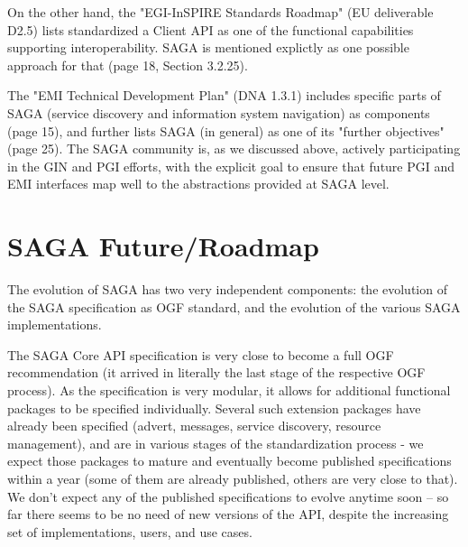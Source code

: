 \documentclass[12pt]{article}
\begin{document}
On the other hand, the "EGI-InSPIRE Standards Roadmap" (EU deliverable
D2.5) lists standardized a Client API as one of the functional
capabilities supporting interoperability.  SAGA is mentioned
explictly as one possible approach for that (page 18, Section
3.2.25).

The "EMI Technical Development Plan" (DNA 1.3.1) includes specific
parts of SAGA (service discovery and information system navigation) as
components (page 15), and further lists SAGA (in general) as one of
its "further objectives" (page 25).  The SAGA community is, as we
discussed above, actively participating in the GIN and PGI efforts,
with the explicit goal to ensure that future PGI and EMI interfaces
map well to the abstractions provided at SAGA level.



\section{SAGA Future/Roadmap}

 The evolution of SAGA has two very independent components: the
 evolution of the SAGA specification as OGF standard, and the
 evolution of the various SAGA implementations.

 The SAGA Core API specification is very close to become a full OGF
 recommendation (it arrived in literally the last stage of the
 respective OGF process).  As the specification is very modular, it
 allows for additional functional packages to be specified
 individually.  Several such extension packages have already been
 specified (advert, messages, service discovery, resource management),
 and are in various stages of the standardization process - we expect
 those packages to mature and eventually become published
 specifications within a year (some of them are already published,
 others are very close to that).  We don't expect any of the published
 specifications to evolve anytime soon -- so far there seems to be no
 need of new versions of the API, despite the increasing set of
 implementations, users, and use cases.
\end{document}
